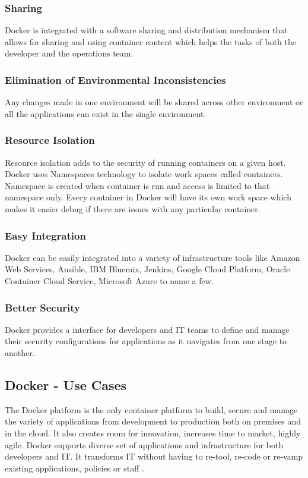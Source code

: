 \documentclass[sigconf]{acmart}
\begin{document}
	\subsubsection{Sharing}
	Docker is integrated with a software sharing and distribution mechanism that allows for sharing and using container content which helps the tasks of both the developer and the operations team.
	\subsubsection{Elimination of Environmental Inconsistencies}
	Any changes made in one environment will be shared across other environment or all the applications can exist in the single environment.
	\subsubsection{Resource Isolation}
	Resource isolation adds to the security of running containers on a given host. Docker uses Namespaces technology to isolate work spaces called containers. Namespace is created when container is run and access is limited to that namespace only. Every container in Docker will have its own work space which makes it easier debug if there are issues with any particular container.
	\subsubsection{Easy Integration}
	Docker can be easily integrated into a variety of infrastructure tools like Amazon Web Services, Ansible, IBM Bluemix, Jenkins, Google Cloud Platform, Oracle Container Cloud Service, Microsoft Azure to name a few.
	\subsubsection{Better Security}
	Docker provides a interface for developers and IT teams to define and manage their security configurations for applications as it navigates from one stage to another.
	
	\subsection{Docker - Use Cases}
	The Docker platform is the only container platform to build, secure and manage the variety of applications from development to production both on premises and in the cloud. It also creates room for innovation, increases time to market, highly agile. Docker supports diverse set of applications and infrastructure for both developers and IT. It transforms IT without having to re-tool, re-code or re-vamp existing applications, policies or staff \cite{hackernoon}.
\end{document}
